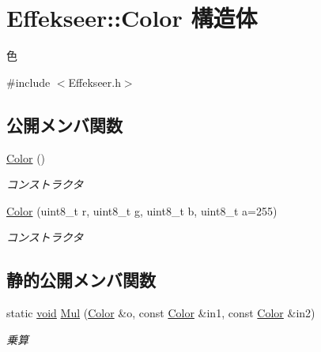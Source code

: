 \hypertarget{struct_effekseer_1_1_color}{}\section{Effekseer\+:\+:Color 構造体}
\label{struct_effekseer_1_1_color}


色  




{\ttfamily \#include $<$Effekseer.\+h$>$}

\subsection*{公開メンバ関数}
\begin{DoxyCompactItemize}
\item 
\mbox{\hyperlink{struct_effekseer_1_1_color_a4d4083a195447aba952703b663e7619a}{Color}} ()
\begin{DoxyCompactList}\small\item\em コンストラクタ \end{DoxyCompactList}\item 
\mbox{\hyperlink{struct_effekseer_1_1_color_ace968f910830ff624662b5371b559703}{Color}} (uint8\+\_\+t r, uint8\+\_\+t g, uint8\+\_\+t b, uint8\+\_\+t a=255)
\begin{DoxyCompactList}\small\item\em コンストラクタ \end{DoxyCompactList}\end{DoxyCompactItemize}
\subsection*{静的公開メンバ関数}
\begin{DoxyCompactItemize}
\item 
static \mbox{\hyperlink{namespace_effekseer_ab34c4088e512200cf4c2716f168deb56}{void}} \mbox{\hyperlink{struct_effekseer_1_1_color_a1f8aa17da0c0d56ca8938eeb9fa9f3e0}{Mul}} (\mbox{\hyperlink{struct_effekseer_1_1_color}{Color}} \&o, const \mbox{\hyperlink{struct_effekseer_1_1_color}{Color}} \&in1, const \mbox{\hyperlink{struct_effekseer_1_1_color}{Color}} \&in2)
\begin{DoxyCompactList}\small\item\em 乗算 \end{DoxyCompactList}\end{DoxyCompactItemize}
